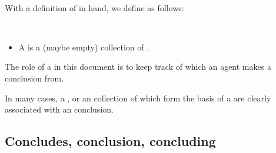 



\paragraph*{}


\begin{note}
  With a definition of  in hand, we define  as follows:

  \begin{definition}[\pool{3}]
    \label{def:pools}
    \mbox{ }
    \vspace{-\baselineskip}
    \begin{itemize}
    \item
      A \emph{\pool{}} is a (maybe empty) collection of .
    \end{itemize}
    \vspace{-\baselineskip}
  \end{definition}

  \noindent%
  The role of a \pool{} in this document is to keep track of which  an agent makes a conclusion from.

  In many cases, a \pool{}, or an collection of \evalN{} which form the basis of a \pool{} are clearly associated with an conclusion.
\end{note}



\subsection{Concludes, conclusion, concluding}
\label{sec:concl-events-which}


